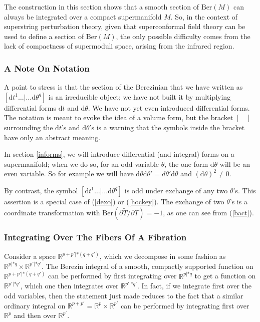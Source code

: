 \documentclass[11pt,a4paper]{article}
\def\tilde{\widetilde}
\def\d{{\mathrm d}}
\def\R{{\mathbb R}}
\def\tilde{\widetilde}
\def\Ber{{\mathrm {Ber}}}
\begin{document}
The construction in this section shows that a smooth section of $\Ber(M)$ can always be integrated over a compact supermanifold $M$.
So, in the context of superstring perturbation theory, given that superconformal field theory can be used to define a section of $\Ber(M)$,
the only possible difficulty comes from the lack of compactness of supermoduli space, arising
from the infrared region. 

\subsubsection{A Note On Notation}\label{notenot}



A point to stress is that the section of the Berezinian that we have written as $[\d t^1\dots |\dots\d\theta^q]$ is an irreducible object; we have not built it by multiplying differential forms $\d t$ and $\d \theta$.  We have not yet even introduced differential forms.  The notation is meant to evoke the idea of a volume form, but
the bracket  $[~~~~]$ surrounding the $\d t$'s and $\d \theta$'s is a warning that the symbols inside the bracket have only
an abstract meaning.

In section \ref{informs}, we will introduce differential (and integral) forms on a supermanifold; when we do so, for an odd variable $\theta$, the one-form $\d\theta$
will be an even variable.  So for example we will have $\d\theta\d\theta'=d\theta'\d\theta$ and  $(\d\theta)^2\not=0$.

By contrast, the symbol $[\d t^1\dots |\dots \d\theta^q]$ is odd under exchange of any two $\theta$'s. This assertion is a special case of (\ref{dexo}) or (\ref{hockey}).
The exchange of two $\theta$'s is a coordinate transformation with $\Ber(\partial \tilde T/\partial T)=-1$, as one can see from (\ref{bact}).  

\subsubsection{Integrating Over The Fibers Of A Fibration}\label{fibration}

Consider a space $\R^{p+p'|*(q+q')}$, which we decompose in some fashion as $\R^{p|*q}\times \R^{p'|*q'}$.  
The Berezin integral of a smooth, compactly supported function on $\R^{p+p'|*(q+q')}$
can be performed by first integrating over $\R^{p|*q}$ to get a function on $\R^{p'|*q'}$, which one then integrates over
$\R^{p'|*q'}$.    In fact, if we integrate first over the odd variables, then the statement just made reduces to the fact
that a similar ordinary integral on $\R^{p+p'}=\R^p\times \R^{p'}$ can be performed by 
integrating first over $\R^p$
and then over $\R^{p'}$.
\end{document}
